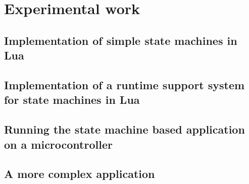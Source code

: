 \chapter{Experimental work}
\label{ch:experimental_work}

\section{Implementation of simple state machines in Lua}
\label{sec:impl_state_machines}

\section{Implementation of a runtime support system for state machines in Lua}
\label{sec:impl_runtime_support}

\section{Running the state machine based application on a microcontroller}
\label{sec:running_on_micro}

\section{A more complex application}
\label{sec:impl_complex_app}
